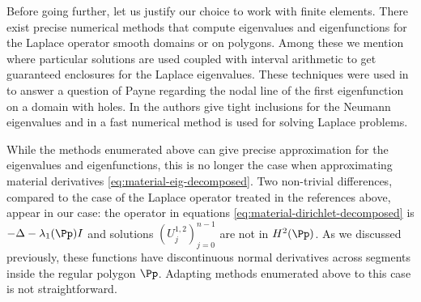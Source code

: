 \begin{rem}
Before going further, let us justify our choice to work with finite elements. There exist precise numerical methods that compute eigenvalues and eigenfunctions for the Laplace operator smooth domains or on polygons. Among these we mention \cite{dahne-salvy} where particular solutions are used coupled with interval arithmetic to get guaranteed enclosures for the Laplace eigenvalues. These techniques were used in~\cite{dahne-payne} to answer a question of Payne regarding the nodal line of the first eigenfunction on a domain with holes. In \cite{barnett-hassell} the authors give tight inclusions for the Neumann eigenvalues and in \cite{trefethen} a fast numerical method is used for solving Laplace problems.

While the methods enumerated above can give precise approximation for the eigenvalues and eigenfunctions, this is no longer the case when approximating material derivatives \eqref{eq:material-eig-decomposed}. Two non-trivial differences, compared to the case of the Laplace operator treated in the references above, appear in our case: the operator in equations \eqref{eq:material-dirichlet-decomposed} is $-\Delta -\lambda_1(\Pp)I$ and solutions $(U_j^{1,2})_{j=0}^{n-1}$ are not in $H^2(\Pp)$. As we discussed previously, these functions have discontinuous normal derivatives across segments inside the regular polygon $\Pp$. Adapting methods enumerated above to this case is not straightforward.
\end{rem}

